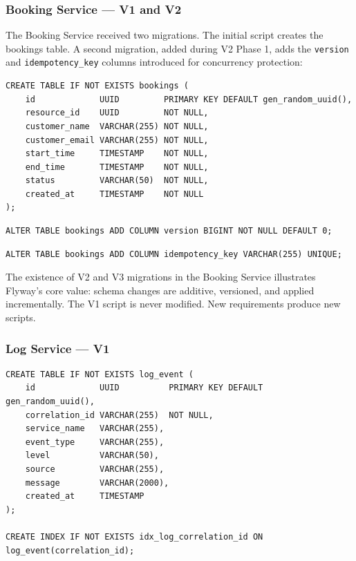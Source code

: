 \subsubsection{Booking Service --- V1 and V2}

The Booking Service received two migrations. The initial script creates the bookings table. A second migration, added during V2 Phase 1, adds the \texttt{version} and \texttt{idempotency\_key} columns introduced for concurrency protection:

\begin{lstlisting}[style=sqlstyle, caption={V1\_\_create\_bookings\_table.sql}]
CREATE TABLE IF NOT EXISTS bookings (
    id             UUID         PRIMARY KEY DEFAULT gen_random_uuid(),
    resource_id    UUID         NOT NULL,
    customer_name  VARCHAR(255) NOT NULL,
    customer_email VARCHAR(255) NOT NULL,
    start_time     TIMESTAMP    NOT NULL,
    end_time       TIMESTAMP    NOT NULL,
    status         VARCHAR(50)  NOT NULL,
    created_at     TIMESTAMP    NOT NULL
);
\end{lstlisting}

\begin{lstlisting}[style=sqlstyle, caption={V2\_\_add\_version\_to\_bookings.sql}]
ALTER TABLE bookings ADD COLUMN version BIGINT NOT NULL DEFAULT 0;
\end{lstlisting}

\begin{lstlisting}[style=sqlstyle, caption={V3\_\_add\_idempotency\_key\_to\_bookings.sql}]
ALTER TABLE bookings ADD COLUMN idempotency_key VARCHAR(255) UNIQUE;
\end{lstlisting}

The existence of V2 and V3 migrations in the Booking Service illustrates Flyway's core value: schema changes are additive, versioned, and applied incrementally. The V1 script is never modified. New requirements produce new scripts.

\subsubsection{Log Service --- V1}

\begin{lstlisting}[style=sqlstyle, caption={V1\_\_create\_log\_event\_table.sql}]
CREATE TABLE IF NOT EXISTS log_event (
    id             UUID          PRIMARY KEY DEFAULT gen_random_uuid(),
    correlation_id VARCHAR(255)  NOT NULL,
    service_name   VARCHAR(255),
    event_type     VARCHAR(255),
    level          VARCHAR(50),
    source         VARCHAR(255),
    message        VARCHAR(2000),
    created_at     TIMESTAMP
);

CREATE INDEX IF NOT EXISTS idx_log_correlation_id ON log_event(correlation_id);
\end{lstlisting}

